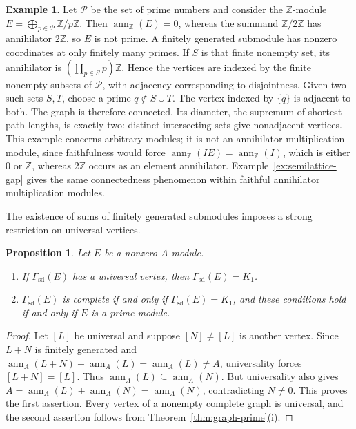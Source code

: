 \documentclass[11pt]{amsart}
\theoremstyle{plain}
\newtheorem{proposition}[theorem]{Proposition}
\theoremstyle{definition}
\newtheorem{example}[theorem]{Example}
\theoremstyle{remark}
\newcommand{\ann}{\operatorname{ann}}
\newcommand{\GammaSD}{\Gamma_{\mathrm{sd}}}
\numberwithin{equation}{section}
\begin{document}
\begin{example}\label{ex:connected-infinite-torsion}
Let $\mathcal P$ be the set of prime numbers and consider the $\mathbb Z$-module
$E=\bigoplus_{p\in\mathcal P}\mathbb Z/p\mathbb Z$.
Then $\ann_{\mathbb Z}(E)=0$, whereas the summand $\mathbb Z/2\mathbb Z$
has annihilator $2\mathbb Z$, so $E$ is not prime.
A finitely generated submodule has nonzero coordinates at only finitely many
primes. If $S$ is that finite nonempty set, its annihilator is
$(\prod_{p\in S}p)\mathbb Z$.
Hence the vertices are indexed by the finite nonempty subsets of $\mathcal P$,
with adjacency corresponding to disjointness.
Given two such sets $S,T$, choose a prime $q\notin S\cup T$.
The vertex indexed by $\{q\}$ is adjacent to both. The graph is therefore
connected. Its diameter, the supremum of shortest-path lengths, is exactly
two: distinct intersecting sets give nonadjacent vertices.
This example concerns arbitrary modules; it is not an annihilator
multiplication module, since faithfulness would force
$\ann_{\mathbb Z}(IE)=\ann_{\mathbb Z}(I)$, which is either $0$ or
$\mathbb Z$, whereas $2\mathbb Z$ occurs as an element annihilator.
Example~\ref{ex:semilattice-gap} gives the same connectedness phenomenon
within faithful annihilator multiplication modules.
\end{example}

The existence of sums of finitely generated submodules imposes a strong
restriction on universal vertices.

\begin{proposition}\label{prop:graph-universal}
Let $E$ be a nonzero $A$-module.
\begin{enumerate}[label=\textup{(\roman*)}]
\item If $\GammaSD(E)$ has a universal vertex, then $\GammaSD(E)=K_1$.
\item $\GammaSD(E)$ is complete if and only if $\GammaSD(E)=K_1$, and
these conditions hold if and only if $E$ is a prime module.
\end{enumerate}
\end{proposition}

\begin{proof}
Let $[L]$ be universal and suppose $[N]\ne[L]$ is another vertex.
Since $L+N$ is finitely generated and
$\ann_A(L+N)+\ann_A(L)=\ann_A(L)\ne A$,
universality forces $[L+N]=[L]$.
Thus $\ann_A(L)\subseteq\ann_A(N)$.
But universality also gives
$A=\ann_A(L)+\ann_A(N)=\ann_A(N)$, contradicting $N\ne0$.
This proves the first assertion. Every vertex of a nonempty complete graph
is universal, and the second assertion follows from
Theorem~\ref{thm:graph-prime}(i).
\end{proof}
\end{document}

